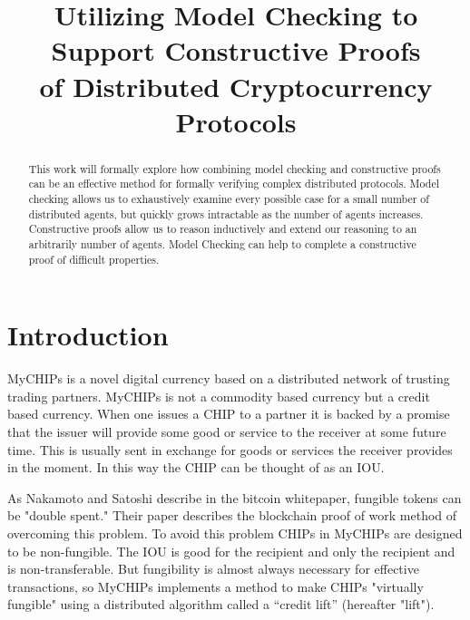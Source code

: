 \documentclass[article, onecolumn, 12pt]{IEEEtran}
\begin{document}
\title{Utilizing Model Checking to Support Constructive Proofs\\
of Distributed Cryptocurrency Protocols}

\author{
}

\maketitle

\begin{abstract}
This work will formally explore how combining model checking and constructive proofs can be an effective method for formally verifying complex distributed protocols. Model checking allows us to exhaustively examine every possible case for a small number of distributed agents, but quickly grows intractable as the number of agents increases. Constructive proofs allow us to reason inductively and extend our reasoning to an arbitrarily number of agents. Model Checking can help to complete a constructive proof of difficult properties.
\end{abstract}

\section{Introduction}
MyCHIPs is a novel digital currency based on a distributed network of trusting trading partners. MyCHIPs is not a commodity based currency but a credit based currency. When one issues a CHIP to a partner it is backed by a promise that the issuer will provide some good or service to the receiver at some future time. This is usually sent in exchange for goods or services the receiver provides in the moment. In this way the CHIP can be thought of as an IOU. 

As Nakamoto and Satoshi describe in the bitcoin whitepaper, fungible tokens can be "double spent." Their paper describes the blockchain proof of work method of overcoming this problem. \cite{bitcoin} To avoid this problem CHIPs in MyCHIPs are designed to be non-fungible. The IOU is good for the recipient and only the recipient and is non-transferable. But fungibility is almost always necessary for effective transactions, so MyCHIPs implements a method to make CHIPs "virtually fungible" using a distributed algorithm called a “credit lift” (hereafter "lift").
\end{document}
